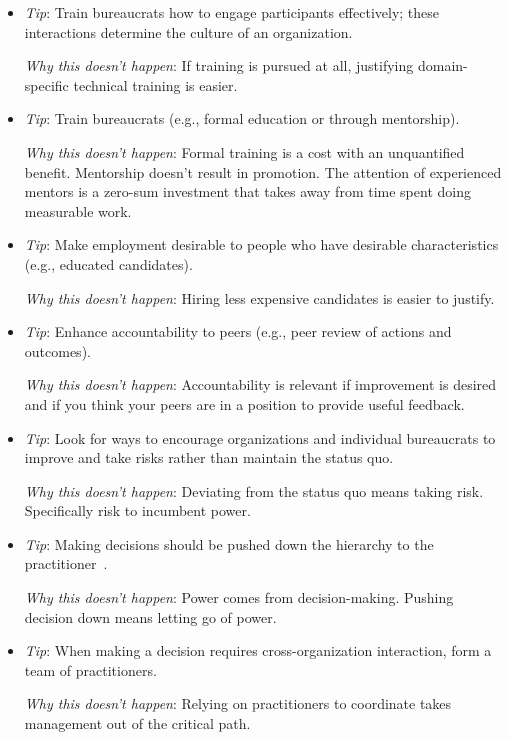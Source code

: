 \begin{itemize}
    \item \textit{Tip}: Train bureaucrats how to engage participants effectively; these interactions determine the culture of an organization. 

    \textit{Why this doesn't happen}: If training is pursued at all, justifying domain-specific technical training is easier. 
    
    \item \textit{Tip}: Train bureaucrats (e.g., formal education or through mentorship).

    \textit{Why this doesn't happen}: Formal training is a cost with an unquantified benefit. Mentorship doesn't result in promotion. The attention of experienced mentors is a zero-sum investment that takes away from time spent doing measurable work.
    
    \item \textit{Tip}: Make employment desirable to people who have desirable characteristics (e.g., educated candidates).

    \textit{Why this doesn't happen}: Hiring less expensive candidates is easier to justify. 
    
    \item \textit{Tip}: Enhance accountability to peers (e.g., peer review of actions and outcomes).

    \textit{Why this doesn't happen}: Accountability is relevant if improvement is desired and if you think your peers are in a position to provide useful feedback. 
    
    \item \textit{Tip}: Look for ways to encourage organizations and individual bureaucrats to improve and take risks rather than maintain the status quo.

    \textit{Why this doesn't happen}: Deviating from the status quo means taking risk. Specifically risk to incumbent power. 
    
    \item \textit{Tip}: Making decisions should be pushed down the hierarchy to the practitioner~\cite{2013_Marquet}.

    \textit{Why this doesn't happen}: Power comes from decision-making. Pushing decision down means letting go of power.
    
    \item \textit{Tip}: When making a decision requires cross-organization interaction, form a team of practitioners.

    \textit{Why this doesn't happen}: Relying on practitioners to coordinate takes management out of the critical path. 
    

\end{itemize}
